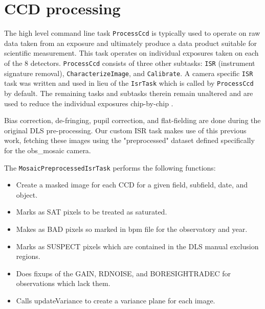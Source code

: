 \documentclass[modern]{aastex61}
\begin{document}
\section{CCD processing}
The high level command line task
{\tt\string ProcessCcd} is typically used to operate on raw data taken from an exposure and ultimately produce a data product suitable for scientific measurement. This task operates on individual exposures taken on each of the 8 detectors. {\tt\string ProcessCcd} consists of three other subtasks: {\tt\string ISR} (instrument signature removal), {\tt\string CharacterizeImage}, and {\tt\string Calibrate}. A camera specific {\tt\string ISR} task was written and used in lieu of the {\tt\string IsrTask} which is called by {\tt\string ProcessCcd} by default. The remaining tasks and subtasks therein remain unaltered and are used to reduce the individual exposures chip-by-chip \cite{2017arXiv170506766B}.

Bias correction, de-fringing, pupil correction, and flat-fielding are done during the original DLS pre-processing. Our custom ISR task makes use of this previous work, fetching these images using the "preprocessed" dataset defined specifically for the obs\_mosaic camera.

The {\tt\string MosaicPreprocessedIsrTask} performs the following functions:

\begin{itemize}
\item Create a masked image for each CCD for a given field, subfield, date, and object.
\item Marks as SAT pixels to be treated as saturated.
\item Makes as BAD pixels so marked in bpm file for the observatory and year.
\item Marks as SUSPECT pixels which are contained in the DLS manual exclusion regions.
\item Does fixups of the GAIN, RDNOISE, and BORESIGHTRADEC for observations which lack them.
\item Calls updateVariance to create a variance plane for each image.
\end{itemize}
\end{document}
